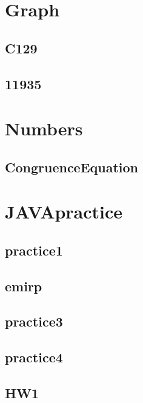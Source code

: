

\section{Graph}
    \subsection{C129}
        
    \subsection{11935}
        

\section{Numbers}
    \subsection{CongruenceEquation}
        

\section{JAVApractice}
    \subsection{practice1}
        
    \subsection{emirp}
        
    \subsection{practice3}
        
    \subsection{practice4}
        
    \subsection{HW1}
        
